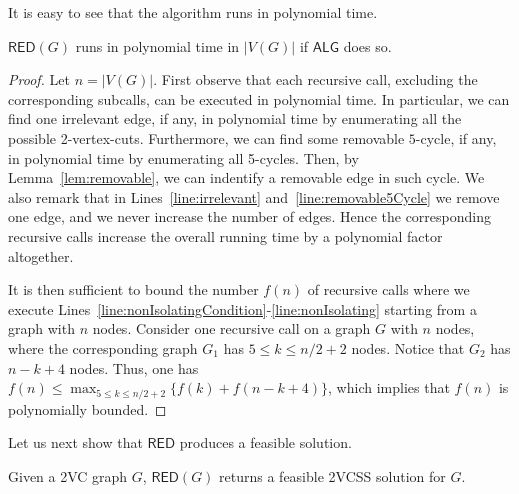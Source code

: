 \documentclass{article}
\newcommand{\ALG}{\mathsf{ALG}}
\newcommand{\RED}{\mathsf{RED}}
\begin{document}
It is easy to see that the algorithm runs in polynomial time. 
\begin{lemma}\label{lem:alg:time}
    $\RED(G)$ runs in polynomial time in $|V(G)|$ if $\ALG$ does so.
\end{lemma}
\begin{proof}
    Let $n=|V(G)|$. First observe that each recursive call, excluding the corresponding subcalls, can be executed in polynomial time. In particular,     
    we can find one irrelevant edge, if any, in polynomial time by enumerating all the possible 2-vertex-cuts. Furthermore, we can find some removable $5$-cycle, if any, in polynomial time by enumerating all 5-cycles. Then, by Lemma~\ref{lem:removable}, we can indentify a removable edge in such cycle. We also remark that in Lines~\ref{line:irrelevant} and~\ref{line:removable5Cycle} we remove one edge, and we never increase the number of edges. Hence the corresponding recursive calls increase the overall running time by a polynomial factor altogether. 

    It is then sufficient to bound the number $f(n)$ of recursive calls where we execute Lines~\ref{line:nonIsolatingCondition}-\ref{line:nonIsolating} starting from a graph with $n$ nodes. Consider one recursive call on a graph $G$ with $n$ nodes, where the corresponding graph $G_1$ has $5\leq k\leq n/2+2$ nodes. Notice that $G_2$ has $n-k+4$ nodes. Thus, one has $f(n)\leq \max_{5\leq k\leq n/2+2}\{f(k)+f(n-k+4)\}$, which implies that $f(n)$ is polynomially bounded.
\end{proof}
Let us next show that $\RED$ produces a feasible solution. 
\begin{lemma}\label{lem:redFeasible}
    Given a 2VC graph $G$, $\RED(G)$ returns a feasible 2VCSS solution for $G$.
\end{lemma}
\end{document}
